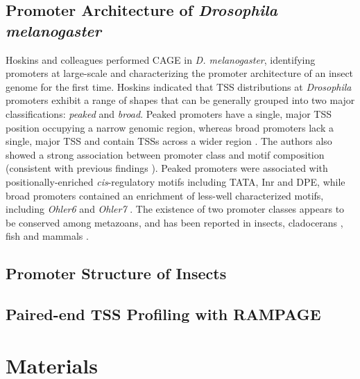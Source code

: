 \documentclass[runningheads,a4paper]{llncs}
\begin{document}
\begin{linenumbers}
\subsection{Promoter Architecture of \textit{Drosophila melanogaster}}
Hoskins and colleagues \cite{Hoskins:2011io} performed CAGE in \textit{D. melanogaster}, identifying promoters at large-scale and characterizing the promoter architecture of an insect genome for the first time.
Hoskins \cite{Hoskins:2011io} indicated that TSS distributions at \textit{Drosophila} promoters exhibit a range of shapes that can be generally grouped into two major classifications: \textit{peaked} and \textit{broad}. 
Peaked promoters have a single, major TSS position occupying a narrow genomic region, whereas broad promoters lack a single, major TSS and contain TSSs across a wider region \cite{Rach:2009ct}\cite{Lenhard:2012en}. 
The authors also showed a strong association between promoter class and motif composition (consistent with previous findings \cite{Rach:2009ct,Ni:2010jh}). 
Peaked promoters were associated with positionally-enriched \textit{cis}-regulatory motifs including TATA, Inr and DPE, while broad promoters contained an enrichment of less-well characterized motifs, including \textit{Ohler6} and \textit{Ohler7} \cite{Ohler:2002vl}. 
The existence of two promoter classes appears to be conserved among metazoans, and has been reported in insects, cladocerans \cite{Raborn:2016cr}, fish \cite{Nepal:2013bga} and mammals \cite{Carninci:2006in,Lenhard:2012en}.

\subsection{Promoter Structure of Insects}


\subsection{Paired-end TSS Profiling with RAMPAGE}




\section{Materials}


\end{linenumbers}
\end{document}
